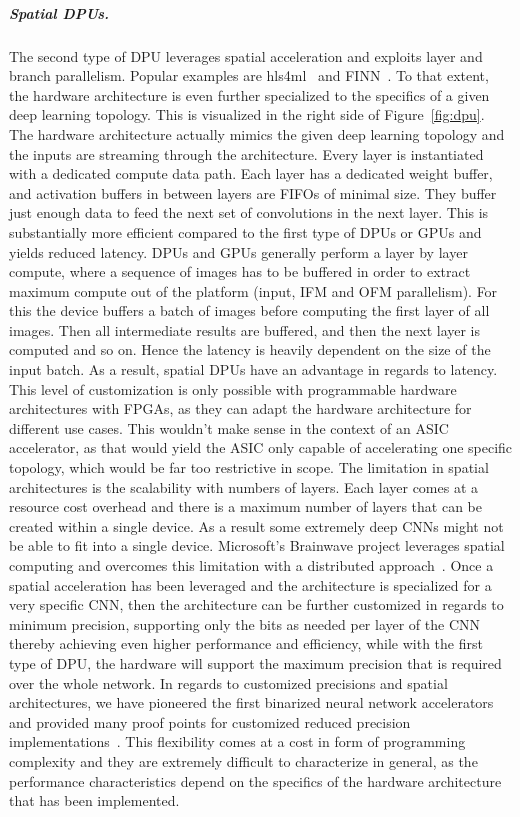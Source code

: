 \subparagraph{Spatial DPUs.} The second type of DPU leverages spatial acceleration and exploits layer and branch parallelism. Popular examples are hls4ml~\cite{hls4mldata_150p} and FINN~\cite{umuroglu2017finn,blott2018finnr}.
To that extent, the hardware architecture is even further specialized to the specifics of a given deep learning topology. 
This is visualized in the right side of Figure~\ref{fig:dpu}. 
The hardware architecture actually mimics the given deep learning topology and the inputs are streaming through the architecture. 
Every layer is instantiated with a dedicated compute data path. 
Each layer has a dedicated weight buffer, and activation buffers in between layers are FIFOs of minimal size. They buffer just enough data to feed the next set of convolutions in the next layer. 
This is substantially more efficient compared to the first type of DPUs or GPUs and yields reduced latency. 
DPUs and GPUs generally perform a layer by layer compute, where a sequence of images has to be buffered in order to extract maximum compute out of the platform (input, IFM and OFM parallelism). 
For this the device buffers a batch of images before computing the first layer of all images. 
Then all intermediate results are buffered, and then the next layer is computed and so on. Hence the latency is heavily dependent on the size of the input batch.
As a result, spatial DPUs have an advantage in regards to latency.
This level of customization is only possible with programmable hardware architectures with FPGAs, as they can adapt the hardware architecture for different use cases. 
This wouldn't make sense in the context of an ASIC accelerator, as that would yield the ASIC only capable of accelerating one specific topology, which would be far too restrictive in scope.
The limitation in spatial architectures is the scalability with numbers of layers. 
Each layer comes at a resource cost overhead and there is a maximum number of layers that can be created within a single device. As a result some extremely deep CNNs might not be able to fit into a single device. Microsoft's Brainwave project leverages spatial computing and overcomes this limitation with a distributed approach~\cite{chung2018serving}.
%
Once a spatial acceleration has been leveraged and the architecture is specialized for a very specific CNN, then the architecture can be further customized in regards to minimum precision, supporting only the bits as needed per layer of the CNN thereby achieving even higher performance and efficiency, while with the first type of DPU, the hardware will support the maximum precision that is required over the whole network. In regards to customized precisions and spatial architectures, we have pioneered the first binarized neural network accelerators \cite{umuroglu2017finn,fraser2017scaling} and provided many proof points for customized reduced precision implementations~\cite{blott2018finnr}. 
This flexibility comes at a cost in form of programming complexity and they are extremely difficult to characterize in general, as the performance characteristics depend on the specifics of the hardware architecture that has been implemented.

